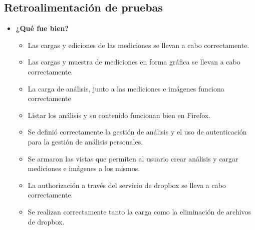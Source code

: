  \subsection{Retroalimentación de pruebas}
 	\begin{itemize}
 		\item \textbf{¿Qué fue bien?}
 		\begin{itemize}
 			\item        Las cargas y ediciones de las mediciones se llevan a cabo correctamente.		
			\item        Las cargas y muestra de mediciones en forma gráfica se llevan a cabo correctamente.			
			\item La carga de análisis, junto a las mediciones e imágenes funciona correctamente
			\item Listar los análisis y su contenido funcionan bien en Firefox.
			\item Se definió correctamente la gestión de análisis y el uso de autenticación para la gestión de análisis personales.
			\item Se armaron las vistas que permiten al usuario crear análisis y cargar mediciones e imágenes a los mismos.			
			\item La authorización a través del servicio de dropbox se lleva a cabo correctamente.
			\item Se realizan correctamente tanto la carga como la eliminación de archivos de dropbox.			
 		\end{itemize}
 		

\end{itemize}
